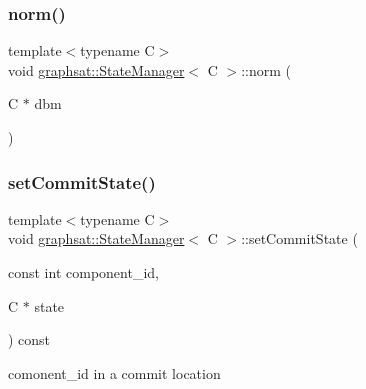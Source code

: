 \mbox{\label{classgraphsat_1_1_state_manager_a8f06abc87af82977699113353b14bb2e}} 
\subsubsection{\texorpdfstring{norm()}{norm()}\hspace{0.1cm}{\footnotesize\ttfamily [2/2]}}
{\footnotesize\ttfamily template$<$typename C$>$ \\
void \mbox{\hyperlink{classgraphsat_1_1_state_manager}{graphsat\+::\+State\+Manager}}$<$ C $>$\+::norm (\begin{DoxyParamCaption}\item[{C $\ast$}]{dbm }\end{DoxyParamCaption})\hspace{0.3cm}{\ttfamily [inline]}}

\mbox{\label{classgraphsat_1_1_state_manager_ac0db1dbde0e7c49cd9556d6f70157fa6}} 
\subsubsection{\texorpdfstring{setCommitState()}{setCommitState()}}
{\footnotesize\ttfamily template$<$typename C$>$ \\
void \mbox{\hyperlink{classgraphsat_1_1_state_manager}{graphsat\+::\+State\+Manager}}$<$ C $>$\+::set\+Commit\+State (\begin{DoxyParamCaption}\item[{const int}]{component\+\_\+id,  }\item[{C $\ast$}]{state }\end{DoxyParamCaption}) const\hspace{0.3cm}{\ttfamily [inline]}}



comonent\+\_\+id in a commit location 


